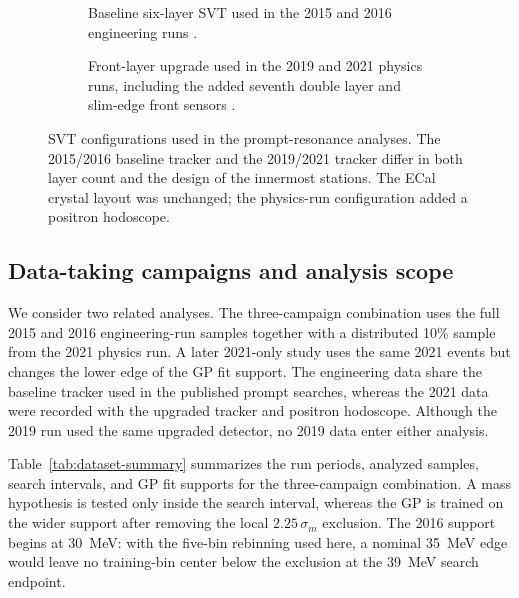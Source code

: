 \begin{figure}[H]
\centering
\begin{subfigure}[t]{0.90\linewidth}
  \centering
  \caption{Baseline six-layer SVT used in the 2015 and 2016 engineering runs
  \cite{HPS2016BumpInternal}.}
\end{subfigure}

\vspace{0.9em}

\begin{subfigure}[t]{0.78\linewidth}
  \centering
  \caption{Front-layer upgrade used in the 2019 and 2021 physics runs, including the
  added seventh double layer and slim-edge front sensors
  \cite{HPSExperiment2022,HPSSlimEdgeSensors2020}.}
\end{subfigure}
\caption{SVT configurations used in the prompt-resonance analyses. The 2015/2016
baseline tracker and the 2019/2021 tracker differ in both layer count and the design
of the innermost stations. The ECal crystal layout was unchanged; the physics-run
configuration added a positron hodoscope.}
\label{fig:hps-svt-eras}
\end{figure}

\subsection{Data-taking campaigns and analysis scope}

We consider two related analyses. The three-campaign combination uses the full 2015 and
2016 engineering-run samples together with a distributed 10\% sample from the 2021
physics run. A later 2021-only study uses the same 2021 events but changes the lower edge
of the GP fit support. The engineering data share the baseline tracker used in the
published prompt searches, whereas the 2021 data were recorded with the upgraded
tracker and positron hodoscope. Although the 2019 run used the same upgraded detector,
no 2019 data enter either analysis.

Table~\ref{tab:dataset-summary} summarizes the run periods, analyzed samples, search
intervals, and GP fit supports for the three-campaign combination. A mass hypothesis is
tested only inside the search interval, whereas the GP is trained on the wider support
after removing the local $2.25\,\sigma_m$ exclusion. The 2016 support begins at
\SI{30}{MeV}: with the five-bin rebinning used here, a nominal \SI{35}{MeV} edge would
leave no training-bin center below the exclusion at the \SI{39}{MeV} search endpoint.


